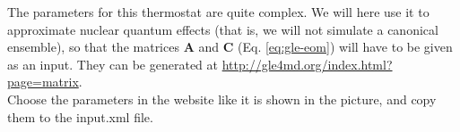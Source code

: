 \documentclass[a4paper,11pt]{scrartcl}
\begin{document}
\begin{itemize}
\begin{enumerate}
\begin{minipage}[l]{0.6\textwidth}
The parameters for this thermostat are quite complex. 
We will here use it to approximate nuclear quantum effects (that is, we will not simulate a canonical ensemble), 
so that the matrices $\mathbf{A}$ and $\mathbf{C}$ (Eq. \ref{eq:gle-eom}) will have to be given as an input. 
They can be generated at  
\href{http://gle4md.org/index.html?page=matrix}{http://gle4md.org/index.html?page=matrix}.\\
Choose the parameters in the website like it is shown in the picture, and copy them to the input.xml file.
\end{minipage}


\end{enumerate}
\end{itemize}
\end{document}
